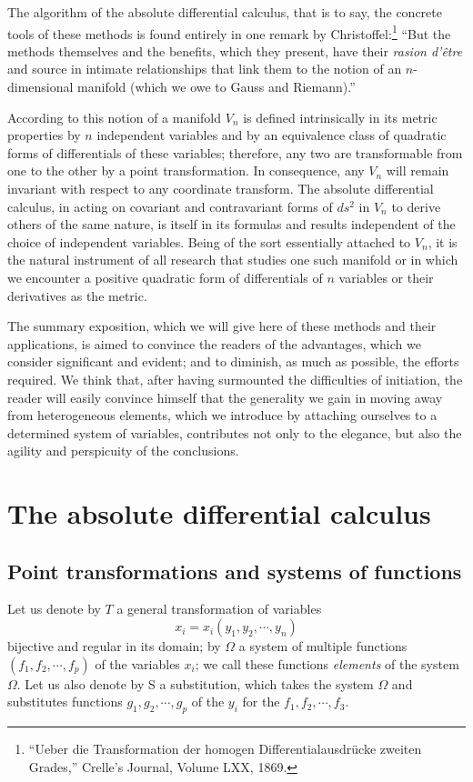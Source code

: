 \documentclass{book}
\begin{document}
The algorithm of the absolute differential calculus, that is to say, the concrete tools of these methods is found entirely in one remark by Christoffel:\footnote{``Ueber die Transformation der homogen Differentialausdr\"{u}cke zweiten Grades,'' Crelle's Journal, Volume LXX, 1869.} ``But the methods themselves and the benefits, which they present, have their \emph{rasion d'\^{e}tre} and source in intimate relationships that link them to the notion of an $n$-dimensional manifold (which we owe to Gauss and Riemann).''

According to this notion of a manifold $V_n$ is defined intrinsically in its metric properties by $n$ independent variables and by an equivalence class of quadratic forms of differentials of these variables; therefore, any two are transformable from one to the other by a point transformation. In consequence, any $V_n$ will remain invariant with respect to any coordinate transform. The absolute differential calculus, in acting on covariant and contravariant forms of $ds^2$ in $V_n$ to derive others of the same nature, is itself in its formulas and results independent of the choice of independent variables. Being of the sort essentially attached to $V_n$, it is the natural instrument of all research that studies one such manifold or in which we encounter a positive quadratic form of differentials of $n$ variables or their derivatives as the metric.

The summary exposition, which we will give here of these methods and their applications, is aimed to convince the readers of the advantages, which we consider significant and evident; and to diminish, as much as possible, the efforts required. We think that, after having surmounted the difficulties of initiation, the reader will easily convince himself that the generality we gain in moving away from heterogeneous elements, which we introduce by attaching ourselves to a determined system of variables, contributes not only to the elegance, but also the agility and perspicuity of the conclusions.
\chapter{The absolute differential calculus}
\section{Point transformations and systems of functions}
Let us denote by $T$ a general transformation of variables
\begin{equation}
x_i=x_i(y_1,y_2,\cdots,y_n)
\end{equation}
bijective and regular in its domain; by $\Omega$ a system of multiple functions \\$(f_1,f_2,\cdots,f_p)$ of the variables $x_i$; we call these functions \emph{elements} of the system $\Omega$. Let us also denote by S a substitution, which takes the system $\Omega$ and substitutes functions $g_1,g_2,\cdots,g_p$ of the $y_i$ for the $f_1,f_2,\cdots,f_3$.
\end{document}
